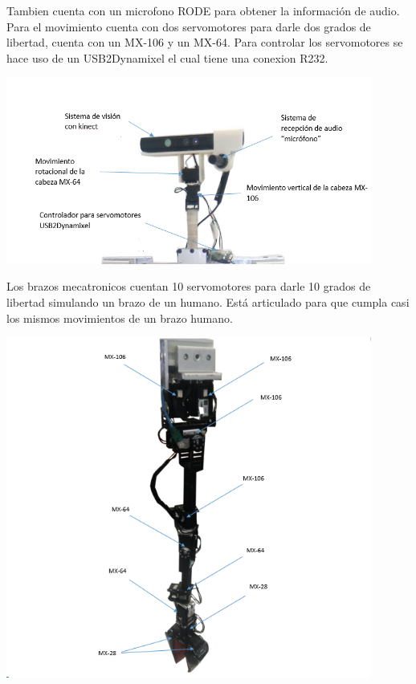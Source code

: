 \documentclass[a4paper]{book}
\begin{document}
Tambien cuenta con un microfono RODE para obtener la información de audio. Para el movimiento cuenta con dos servomotores
para darle dos grados de libertad, cuenta con un MX-106 y un MX-64. Para controlar los servomotores se hace uso de un
USB2Dynamixel el cual tiene una conexion R232.

\begin{center}
\includegraphics[width=0.9\textwidth]{Figures/Hardware/Diagramas/Cabeza.png}
\label{fig:Hardware:Diagramas:Justina:Completa}
\end{center}

\newpage
Los brazos mecatronicos cuentan 10 servomotores para darle 10 grados de libertad simulando un brazo de un humano.
Está articulado para que cumpla casi los mismos movimientos de un brazo humano.

\begin{center}
\includegraphics[width=0.9\textwidth]{Figures/Hardware/Diagramas/Brazo.png}
\label{fig:Hardware:Diagramas:Justina:Brazo}
\end{center}
\end{document}
